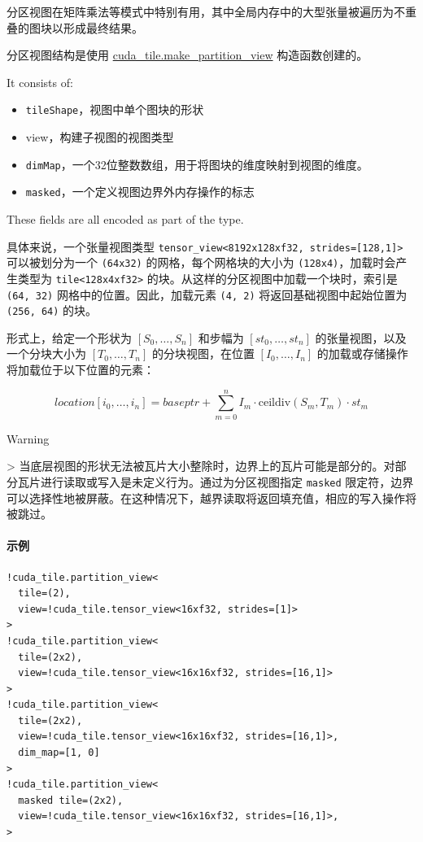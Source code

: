 \documentclass{article}
\begin{document}
分区视图在矩阵乘法等模式中特别有用，其中全局内存中的大型张量被遍历为不重叠的图块以形成最终结果。


分区视图结构是使用 \href{https://docs.nvidia.com/cuda/tile-ir/latest/sections/operations.html#op-cuda-tile-make-partition-view}{cuda\_tile.make\_partition\_view} 构造函数创建的。


It consists of:


\begin{itemize}
\item \texttt{tileShape}，视图中单个图块的形状
\item view，构建子视图的视图类型
\item \texttt{dimMap}，一个32位整数数组，用于将图块的维度映射到视图的维度。
\item \texttt{masked}，一个定义视图边界外内存操作的标志

\end{itemize}
These fields are all encoded as part of the type.


具体来说，一个张量视图类型 \texttt{tensor\_view<8192x128xf32, strides=[128,1]>} 可以被划分为一个 \texttt{(64x32)} 的网格，每个网格块的大小为 \texttt{(128x4)}，加载时会产生类型为 \texttt{tile<128x4xf32>} 的块。从这样的分区视图中加载一个块时，索引是 \texttt{(64, 32)} 网格中的位置。因此，加载元素 \texttt{(4, 2)} 将返回基础视图中起始位置为 \texttt{(256, 64)} 的块。


形式上，给定一个形状为 $[ S_0, \ldots, S_n ]$ 和步幅为 $[ st_0, \ldots, st_n ]$ 的张量视图，以及一个分块大小为 $[ T_0, \ldots, T_n ]$ 的分块视图，在位置 $[ I_0, \ldots, I_n ]$ 的加载或存储操作将加载位于以下位置的元素：

$$location[i_0,\ldots,i_n] = baseptr + \sum_{m=0}^{n} I_m \cdot \mathrm{ceildiv}(S_m, T_m) \cdot st_m$$

Warning

> 当底层视图的形状无法被瓦片大小整除时，边界上的瓦片可能是部分的。对部分瓦片进行读取或写入是未定义行为。通过为分区视图指定 \texttt{masked} 限定符，边界可以选择性地被屏蔽。在这种情况下，越界读取将返回填充值，相应的写入操作将被跳过。



\paragraph{示例}

\begin{lstlisting}
!cuda_tile.partition_view<
  tile=(2),
  view=!cuda_tile.tensor_view<16xf32, strides=[1]>
>
!cuda_tile.partition_view<
  tile=(2x2),
  view=!cuda_tile.tensor_view<16x16xf32, strides=[16,1]>
>
!cuda_tile.partition_view<
  tile=(2x2),
  view=!cuda_tile.tensor_view<16x16xf32, strides=[16,1]>,
  dim_map=[1, 0]
>
!cuda_tile.partition_view<
  masked tile=(2x2),
  view=!cuda_tile.tensor_view<16x16xf32, strides=[16,1]>,
>
\end{lstlisting}
\end{document}
